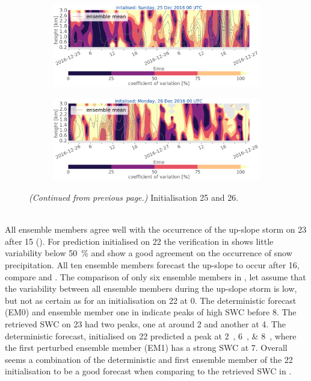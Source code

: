 \begin{figure}[t!]\ContinuedFloat
	\begin{subfigure}[b]{\textwidth}
		\includegraphics[trim={0cm 5cm 0cm 0cm},clip,width=\textwidth]{./fig_variation/20161225}
		\caption{}\label{fig:vari:EM25}
	\end{subfigure}
	\begin{subfigure}[b]{\textwidth}
		\includegraphics[trim={0cm 0cm 0cm 0cm},clip,width=\textwidth]{./fig_variation/20161226}
		\caption{}\label{fig:vari:EM26}
	\end{subfigure}
	\caption{\textit{(Continued from previous page.)} Initialisation \num{25} and \SI{26}{\dec}.}
\end{figure}
\noindent
\\
All ensemble members agree well with the occurrence of the up-slope storm on \SI{23}{\dec} after \SI{15}{\UTC} (). For prediction initialised on \SI{22}{\dec} the verification in  shows little variability below \SI{50}{\percent} and show a good agreement on the occurrence of snow precipitation. All ten ensemble members forecast the up-slope to occur after \SI{16}{\UTC}, compare  and . The comparison of only six ensemble members in , let assume that the variability between all ensemble members during the up-slope storm is low, but not as certain as for an initialisation on \SI{22}{\dec} at \SI{0}{\UTC}. 
The deterministic forecast (EM0) and ensemble member one in  indicate peaks of high SWC before \SI{8}{\UTC}. The retrieved SWC on \SI{23}{\dec} had two peaks, one at around \SI{2}{\UTC} and another at \SI{4}{\UTC}. The deterministic forecast, initialised on \SI{22}{\dec} predicted a peak at \SIlist{2;6;8}{\UTC}, where the first perturbed ensemble member (EM1) has a strong SWC at \SI{7}{\UTC}. Overall seems a combination of the deterministic and first ensemble member of the  \SI{22}{\dec} initialisation to be a good forecast when comparing to the retrieved SWC in .
